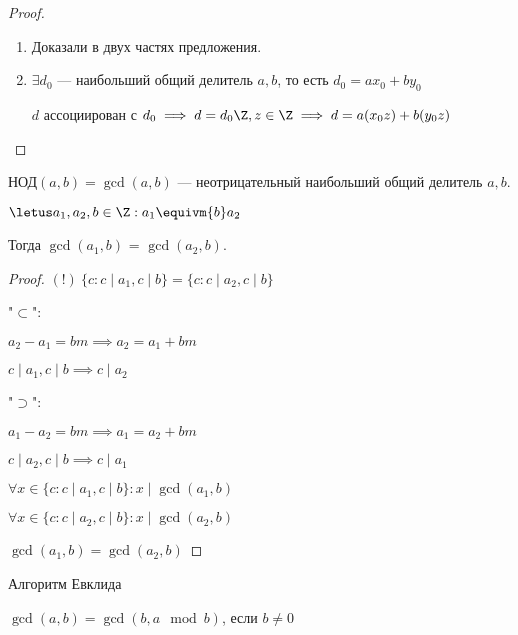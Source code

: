 \begin{proof}
    \begin{enumerate}
        \item Доказали в двух частях предложения.
        
        \item $\exists d_0$ --- наибольший общий делитель $a, b$, то есть $d_0 = ax_0 + by_0$
        
        $d$ ассоциирован с $d_0 \implies d = d_0\Z, z \in \Z \implies d = a(x_0z) + b(y_0z)$
    \end{enumerate}
\end{proof}

\begin{defn}
    НОД$(a, b) = \gcd(a, b)$ --- неотрицательный наибольший общий делитель $a, b$.
\end{defn}

\begin{theorem-non}
    $\letus a_1, a_2, b \in \Z: a_1 \equivm{b} a_2$
    
    Тогда $\gcd(a_1, b)$ = $\gcd(a_2, b)$.
\end{theorem-non}

\begin{proof}
    $(!)~\{c: c \mid a_1, c \mid b \} = \{c : c \mid a_2, c \mid b\}$
    
    "$\subset$":
    
    $a_2 - a_1 = bm \implies a_2 = a_1 + bm$
    
    $c \mid a_1, c \mid b \implies c \mid a_2$

    "$\supset$":
    
    $a_1 - a_2 = bm \implies a_1 = a_2 + bm$

    $c \mid a_2, c \mid b \implies c \mid a_1$
    
    $\forall x \in \{c: c \mid a_1, c \mid b \}: x \mid \gcd(a_1, b)$
    
    $\forall x \in \{c: c \mid a_2, c \mid b \}: x \mid \gcd(a_2, b)$
    
    $\gcd(a_1, b) = \gcd(a_2, b)$
\end{proof}

\begin{defn} 
    Алгоритм Евклида

    $\gcd(a, b) = \gcd(b, a \mod b)$, если $b \neq 0$
\end{defn}